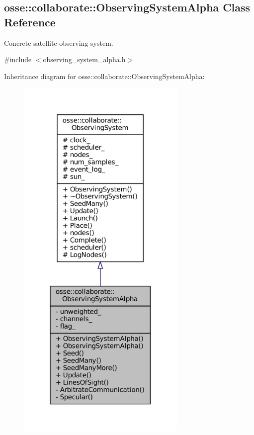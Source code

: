 \hypertarget{classosse_1_1collaborate_1_1_observing_system_alpha}{}\subsection{osse\+:\+:collaborate\+:\+:Observing\+System\+Alpha Class Reference}
\label{classosse_1_1collaborate_1_1_observing_system_alpha}


Concrete satellite observing system.  




{\ttfamily \#include $<$observing\+\_\+system\+\_\+alpha.\+h$>$}



Inheritance diagram for osse\+:\+:collaborate\+:\+:Observing\+System\+Alpha\+:
\nopagebreak
\begin{figure}[H]
\begin{center}
\leavevmode
\includegraphics[width=231pt]{classosse_1_1collaborate_1_1_observing_system_alpha__inherit__graph}
\end{center}
\end{figure}
